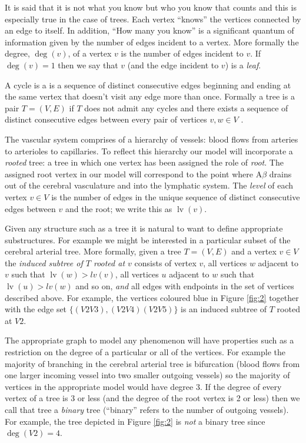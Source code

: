 \documentclass[10pt]{amsart} %
\theoremstyle{definition}
\newtheorem{ex}[thm]{Example}
\DeclareMathOperator{\lv}{lv}
\begin{document}


It is said that it is not what you know but who you know that counts and this is especially true in the case of trees. Each 
vertex ``knows'' the vertices connected by an edge to itself. In addition, ``How many you know'' is a significant quantum of 
information given by the number of 
edges incident to a vertex. More formally the degree, $\deg(v)$, of a vertex $v$ is the number of edges incident to $v$.  If 
$\deg(v) = 1$ then we say that $v$ (and the edge incident to $v$) is a \emph{leaf}.       

A cycle is a is a sequence of distinct consecutive edges beginning and ending at the same vertex that doesn't visit any edge 
more than once. Formally a tree is a pair $T = (V,E)$ if $T$ does not admit any cycles and
there exists a sequence of distinct consecutive edges between every pair of vertices $v,w \in V$ \cite{bela}.  

The vascular system comprises of a hierarchy of vessels: blood flows from arteries to arterioles to capillaries.  
To reflect this hierarchy our model will incorporate a \emph{rooted} tree: a tree in which one vertex has been assigned the
role of \emph{root}.  The assigned root vertex in our model will correspond to the point where A$\beta$ drains out of the
cerebral vasculature and into the lymphatic system. The \emph{level} of each vertex $v \in V$ is the number of edges in the
unique sequence of distinct consecutive edges between $v$ and the root; we write this as $\lv(v)$.

Given any structure such as a tree it is natural to want to define appropriate substructures.  For example we might be 
interested in  a particular subset of the cerebral arterial tree. More formally, given a tree $T = (V,E)$ and a vertex 
$v \in V$ the \emph{induced subtree of $T$ rooted at $v$} consists of vertex $v$, all vertices $w$ adjacent to $v$ such 
that $\lv(w) > lv(v)$,  all vertices $u$ adjacent to $w$ such that $\lv(u) > lv(w)$ and so on,  \emph{and} all edges with 
endpoints in the set of vertices described above.  For example, the vertices coloured blue in Figure \ref{fig:2} together with 
the edge set $\{(V2V3),(V2V4)(V2V5)\}$ is an induced subtree of $T$ rooted at $V2$.  
 
The appropriate graph to model any phenomenon will have properties such as a restriction on the degree of a particular or all 
of the vertices.  For example the majority of branching in the cerebral arterial tree is bifurcation (blood flows from one larger incoming vessel into two smaller 
outgoing vessels)
\cite{Cassot} so the majority 
 of vertices in the appropriate model would have degree 3.   If the degree of every vertex of a tree is 3 or less (and the degree of the root vertex is 2 or less) then we call
 that tree a \emph{binary} tree  (``binary'' refers to the number of outgoing vessels).  For example,
the tree depicted in Figure \ref{fig:2} is \emph{not} a binary tree since $\deg(V2) = 4$.
\end{document}

